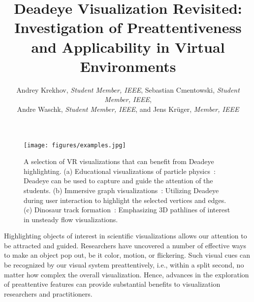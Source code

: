 \documentclass[journal]{vgtc}                %
\title{Deadeye Visualization Revisited: Investigation of Preattentiveness and Applicability in Virtual Environments}
\author{Andrey Krekhov, \textit{Student Member, IEEE}, Sebastian Cmentowski, \textit{Student Member, IEEE},\\ Andre Waschk, \textit{Student Member, IEEE}, and Jens Kr\"uger, \textit{Member, IEEE}}
\begin{document}


 

\maketitle


\begin{figure*}[t!]
\centering
\texttt{[image: figures/examples.jpg]}
\caption{A selection of VR visualizations that can benefit from Deadeye highlighting. (a) Educational visualizations of particle physics~\protect\cite{duer2018belle2vr}: Deadeye can be used to capture and guide the attention of the students. (b) Immersive graph visualizations~\protect\cite{kwon16imsv}: Utilizing Deadeye during user interaction to highlight the selected vertices and edges. (c) Dinosaur track formation~\protect\cite{novotny2019developing}: Emphasizing 3D pathlines of interest in unsteady flow visualizations.}
\label{fig:examples}
\end{figure*}




Highlighting objects of interest in scientific visualizations allows our attention to be attracted and guided. Researchers have uncovered a number of effective ways to make an object pop out, be it color, motion, or flickering. Such visual cues can be recognized by our visual system preattentively, i.e., within a split second, no matter how complex the overall visualization. Hence, advances in the exploration of preattentive features can provide substantial benefits to visualization researchers and practitioners.
\end{document}
